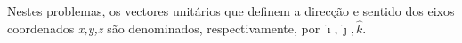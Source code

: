 \documentclass[\mainfilename]{subfiles}
\begin{document}
\begin{questionBox}
\begin{questionBox}
            

        	

        
    \end{questionBox}
\end{questionBox}

\renewcommand\thequestion{Problema \arabic{question}}
\renewcommand\thesubquestion{P\arabic{question} \alph{subquestion}.}

\begin{minipage}{1\textwidth}
    \group{}
    
    Nestes problemas, os vectores unitários que definem a direcção e sentido dos eixos coordenados \textit{x,y,z} são denominados, respectivamente, por \(\hat{\imath},\hat{\jmath},\hat{k}\).
\end{minipage}
\end{document}
